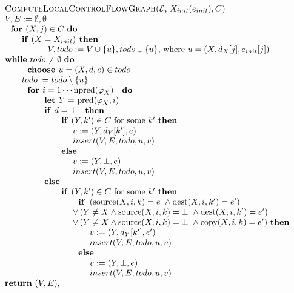 \begin{equation*}
\begin{tabular}{l}
\textsc{ComputeLocalControlFlowGraph(}$\mathcal{E}$, $X_{init}(e_{init}),C$%
\textsc{)} \\ 
$V,E:=\emptyset ,\emptyset $ \\ 
$\text{\textbf{for }}(X,j)\in C$ \textbf{do} \\ 
$\qquad $\textbf{if} $(X=X_{init})$\textbf{\ then} \\ 
$\qquad \qquad \text{\textbf{\ }}V,todo:=V\cup \{u\},todo\cup \{u\}$, where $%
u=(X,d_{X}[j],e_{init}[j])$ \\ 
\textbf{while} $todo\neq \emptyset $ \textbf{do} \\ 
$\qquad \text{\textbf{choose }}u=(X,d,e)\in todo$ \\ 
$\qquad todo:=todo\setminus \{u\}$ \\ 
$\qquad \text{\textbf{for }}i=1\cdots \mathrm{npred}(\varphi _{X})\text{ 
\textbf{do}}$ \\ 
$\qquad \qquad \text{\textbf{let }}Y=$ $\mathrm{pred}(\varphi _{X},i)$ \\ 
$\qquad \qquad \text{\textbf{if }}d=\bot $ $\text{\textbf{then}}$ \\ 
$\qquad \qquad \qquad \text{\textbf{if }}(Y,k^{\prime })\in C$ for some $%
k^{\prime }$ \textbf{then} \\ 
$\qquad \qquad \qquad \qquad v:=(Y,d_{Y}[k^{\prime }],e)$ \\ 
$\qquad \qquad \qquad \qquad insert(V,E,todo,u,v)$ \\ 
$\qquad \qquad \qquad \text{\textbf{else}}$ \\ 
$\qquad \qquad \qquad \qquad v:=(Y,\bot ,e)$ \\ 
$\qquad \qquad \qquad \qquad insert(V,E,todo,u,v)$ \\ 
$\qquad \qquad \text{\textbf{else}}$ \\ 
$\qquad \qquad \qquad \text{\textbf{if }}(Y,k^{\prime })\in C$ for some $%
k^{\prime }$ \textbf{then} \\ 
$\qquad \qquad \qquad \qquad \text{\textbf{if }}\left( \mathrm{source}%
(X,i,k)=e\mathbf{\ }\wedge \mathrm{dest}(X,i,k^{\prime })=e^{\prime }\right) 
$ \\ 
$\qquad \qquad \qquad \qquad \vee \left( Y\neq X\wedge \mathrm{source}%
(X,i,k)=\bot \mathbf{\ }\wedge \mathrm{dest}(X,i,k^{\prime })=e^{\prime
}\right) $ \\ 
$\qquad \qquad \qquad \qquad \vee \left( Y\neq X\wedge \mathrm{source}%
(X,i,k)=\bot \mathbf{\ }\wedge \mathrm{copy}(X,i,k)=e^{\prime }\right) $ 
\textbf{then} \\ 
$\qquad \qquad \qquad \qquad \qquad v:=(Y,d_{Y}[k^{\prime }],e^{\prime })$
\\ 
$\qquad \qquad \qquad \qquad \qquad insert(V,E,todo,u,v)\qquad $ \\ 
$\qquad \qquad \qquad \qquad \text{\textbf{else}}$ \\ 
$\qquad \qquad \qquad \qquad \qquad v:=(Y,\bot ,e)$ \\ 
$\qquad \qquad \qquad \qquad \qquad insert(V,E,todo,u,v)\qquad $ \\ 
\textbf{return} $(V,E),$%
\end{tabular}%
\end{equation*}%
